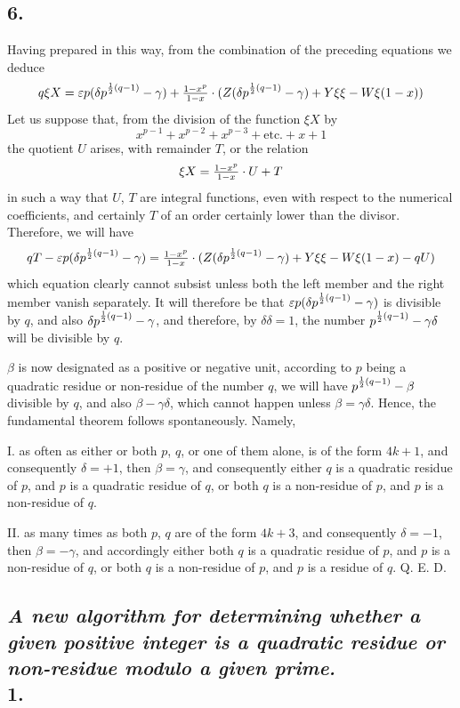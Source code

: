 \documentclass[twoside,12pt, showframe]{memoir}
\let\oldfrac\frac
\def\frac#1#2{\mathchoice{\tfrac{#1}{#2}}{\oldfrac{#1}{#2}}{\genfrac{}{}{}{2}{#1}{#2\mathstrut}}{\genfrac{}{}{}{3}{#1}{#2\mathstrut}}}
\begin{document}
\subsection*{6.}

Having prepared in this way, from the combination of the preceding equations we deduce
\[q \xi {X}=\varepsilon p(\delta p^{\frac{1}{2}(q-1)}-\gamma)+\frac{1-x^{p}}{1-x} \cdot(Z(\delta p^{\frac{1}{2}(q-1)}-\gamma)+Y \xi \xi-W \xi(1-x))\]
Let us suppose that, from the division of the function \(\xi X\) by
\[x^{p-1}+x^{p-2}+x^{p-3}+\text{etc.}+x+1\]
the quotient \(U\) arises, with remainder \(T\), or the relation
\[\xi X=\frac{1-x^{p}}{1-x} \cdot U+T\]
in such a way that \(U\), \(T\) are integral functions, even with respect to the numerical coefficients, and certainly \(T\) of an order certainly lower than the divisor. Therefore, we will have
\[q T-\varepsilon p(\delta p^{\frac{1}{2}(q-1)}-\gamma)=\frac{1-x^{p}}{1-x} \cdot(Z(\delta p^{\frac{1}{2}(q-1)}-\gamma)+Y \xi \xi-W \xi(1-x)-q U)\]
which equation clearly cannot subsist unless both the left member and the right member vanish separately. It will therefore be that \(\varepsilon p(\delta p^{\frac{1}{2}(q-1)}-\gamma)\) is divisible by \(q\), and also \(\delta p^{\frac{1}{2}(q-1)}-\gamma\), and therefore, by \(\delta \delta=1\), the number \(p^{\frac{1}{2}(q-1)}-\gamma \delta\) will be divisible by \(q\).
%

\(\beta\) is now designated as a positive or negative unit, according to \(p\) being a quadratic residue or non-residue of the number \(q\), we will have \(p^{\frac{1}{2}(q-1)}-\beta\) divisible by \(q\), and also \(\beta-\gamma \delta\), which cannot happen unless \(\beta=\gamma \delta\). Hence, the fundamental theorem follows spontaneously. Namely,

I. as often as either or both \(p\), \(q\), or one of them alone, is of the form \(4 k+1\), and consequently \(\delta=+1\), then \(\beta=\gamma\), and consequently either \(q\) is a quadratic residue of \(p\), and \(p\) is a quadratic residue of \(q\), or both \(q\) is a non-residue of \(p\), and \(p\) is a non-residue of \(q\).

II. as many times as both \(p\), \(q\) are of the form \(4 k+3\), and consequently \(\delta=-1\), then \(\beta=-\gamma\), and accordingly either both \(q\) is a quadratic residue of \(p\), and \(p\) is a non-residue of \(q\), or both \(q\) is a non-residue of \(p\), and \(p\) is a residue of \(q\). Q. E. D.
%

\subsection*{{\scriptsize \textit{A new algorithm for determining whether a given positive integer is a quadratic residue or non-residue modulo a given prime.}}\\
1.}
\end{document}
